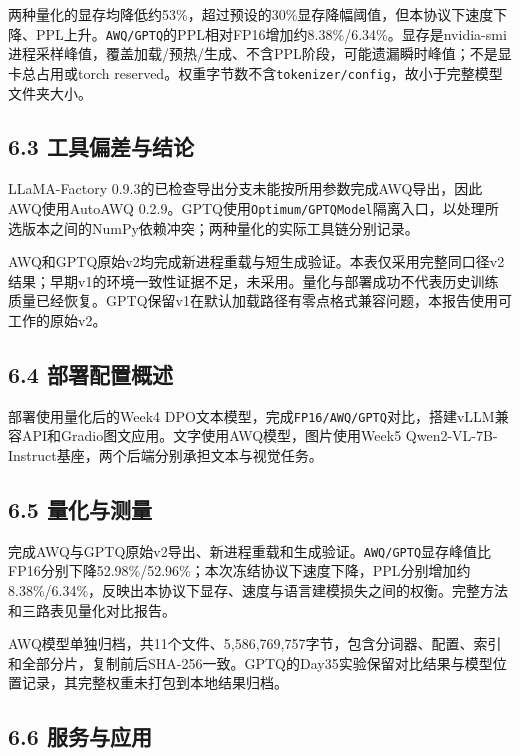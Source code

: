 \documentclass[UTF8,fontset=fandol,a4paper,11pt]{ctexart}
\begin{document}
{两种量化的显存均降低约53\%，超过预设的30\%显存降幅阈值，但本协议下速度下降、PPL上升。\nolinkurl{AWQ/GPTQ}的PPL相对FP16增加约8.38\%/6.34\%。显存是nvidia-smi进程采样峰值，覆盖加载/预热/生成、不含PPL阶段，可能遗漏瞬时峰值；不是显卡总占用或torch}
{reserved。权重字节数不含\nolinkurl{tokenizer/config}，故小于完整模型文件夹大小。}

\subsection{6.3 工具偏差与结论}\label{ux5de5ux5177ux504fux5deeux4e0eux7ed3ux8bba}

LLaMA-Factory
0.9.3的已检查导出分支未能按所用参数完成AWQ导出，因此AWQ使用AutoAWQ
{0.2.9。GPTQ使用\nolinkurl{Optimum/GPTQModel}隔离入口，以处理所选版本之间的NumPy依赖冲突；两种量化的实际工具链分别记录。}

AWQ和GPTQ原始v2均完成新进程重载与短生成验证。本表仅采用完整同口径v2结果；早期v1的环境一致性证据不足，未采用。量化与部署成功不代表历史训练质量已经恢复。GPTQ保留v1在默认加载路径有零点格式兼容问题，本报告使用可工作的原始v2。

\subsection{6.4 部署配置概述}\label{ux90e8ux7f72ux914dux7f6eux6982ux8ff0}

部署使用量化后的Week4
{DPO文本模型，完成\nolinkurl{FP16/AWQ/GPTQ}对比，搭建vLLM兼容API和Gradio图文应用。文字使用AWQ模型，图片使用Week5}
Qwen2-VL-7B-Instruct基座，两个后端分别承担文本与视觉任务。

\subsection{6.5 量化与测量}\label{ux91cfux5316ux4e0eux6d4bux91cf}

{完成AWQ与GPTQ原始v2导出、新进程重载和生成验证。\nolinkurl{AWQ/GPTQ}显存峰值比FP16分别下降52.98\%/52.96\%；本次冻结协议下速度下降，PPL分别增加约8.38\%/6.34\%，反映出本协议下显存、速度与语言建模损失之间的权衡。完整方法和三路表见量化对比报告。}

AWQ模型单独归档，共11个文件、5,586,769,757字节，包含分词器、配置、索引和全部分片，复制前后SHA-256一致。GPTQ的Day35实验保留对比结果与模型位置记录，其完整权重未打包到本地结果归档。

\subsection{6.6 服务与应用}\label{ux670dux52a1ux4e0eux5e94ux7528}
\end{document}
